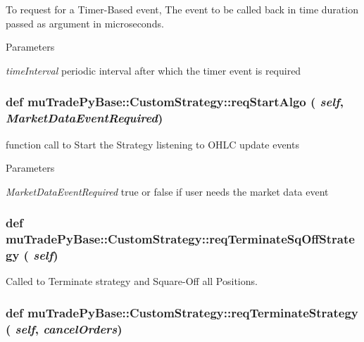 To request for a Timer-\/Based event, The event to be called back in time duration passed as argument in microseconds. 
\begin{DoxyParams}{Parameters}
\item[{\em timeInterval}]periodic interval after which the timer event is required \end{DoxyParams}
\hypertarget{classmuTradePyBase_1_1CustomStrategy_a67ba152e8e50acf69bc02ca08088bb0a}{
\subsubsection[{reqStartAlgo}]{\setlength{\rightskip}{0pt plus 5cm}def muTradePyBase::CustomStrategy::reqStartAlgo ( {\em self}, \/   {\em MarketDataEventRequired})}}
\label{classmuTradePyBase_1_1CustomStrategy_a67ba152e8e50acf69bc02ca08088bb0a}


function call to Start the Strategy listening to OHLC update events 
\begin{DoxyParams}{Parameters}
\item[{\em MarketDataEventRequired}]true or false if user needs the market data event \end{DoxyParams}
\hypertarget{classmuTradePyBase_1_1CustomStrategy_aead1310f3a4aa6c69d792ed18669bec1}{
\subsubsection[{reqTerminateSqOffStrategy}]{\setlength{\rightskip}{0pt plus 5cm}def muTradePyBase::CustomStrategy::reqTerminateSqOffStrategy ( {\em self})}}
\label{classmuTradePyBase_1_1CustomStrategy_aead1310f3a4aa6c69d792ed18669bec1}


Called to Terminate strategy and Square-\/Off all Positions. \hypertarget{classmuTradePyBase_1_1CustomStrategy_a6ebd2277cb90f65608bd4d636087b61e}{
\subsubsection[{reqTerminateStrategy}]{\setlength{\rightskip}{0pt plus 5cm}def muTradePyBase::CustomStrategy::reqTerminateStrategy ( {\em self}, \/   {\em cancelOrders})}}
\label{classmuTradePyBase_1_1CustomStrategy_a6ebd2277cb90f65608bd4d636087b61e}


